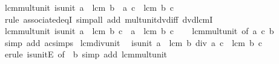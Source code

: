 \begin{isabellebody}
\endisatagproof
{\isafoldproof}%
%
\isadelimproof
\isanewline
%
\endisadelimproof
\isanewline
{}\isamarkupfalse%
\ lcm{\isacharunderscore}{\kern0pt}mult{\isacharunderscore}{\kern0pt}unit{}{\isacharcolon}{\kern0pt}\ {\isachardoublequoteopen}is{\isacharunderscore}{\kern0pt}unit\ a\ {\isasymLongrightarrow}\ lcm\ {\isacharparenleft}{\kern0pt}b\ {\isacharasterisk}{\kern0pt}\ a{\isacharparenright}{\kern0pt}\ c\ {\isacharequal}{\kern0pt}\ lcm\ b\ c{\isachardoublequoteclose}\isanewline
%
\isadelimproof
\ \ %
\endisadelimproof
%
\isatagproof
{}\isamarkupfalse%
\ {\isacharparenleft}{\kern0pt}rule\ associated{\isacharunderscore}{\kern0pt}eqI{\isacharparenright}{\kern0pt}\ {\isacharparenleft}{\kern0pt}simp{\isacharunderscore}{\kern0pt}all\ add{\isacharcolon}{\kern0pt}\ mult{\isacharunderscore}{\kern0pt}unit{\isacharunderscore}{\kern0pt}dvd{\isacharunderscore}{\kern0pt}iff\ dvd{\isacharunderscore}{\kern0pt}lcmI{}{\isacharparenright}{\kern0pt}%
\endisatagproof
{\isafoldproof}%
%
\isadelimproof
\isanewline
%
\endisadelimproof
\isanewline
{}\isamarkupfalse%
\ lcm{\isacharunderscore}{\kern0pt}mult{\isacharunderscore}{\kern0pt}unit{}{\isacharcolon}{\kern0pt}\ {\isachardoublequoteopen}is{\isacharunderscore}{\kern0pt}unit\ a\ {\isasymLongrightarrow}\ lcm\ b\ {\isacharparenleft}{\kern0pt}c\ {\isacharasterisk}{\kern0pt}\ a{\isacharparenright}{\kern0pt}\ {\isacharequal}{\kern0pt}\ lcm\ b\ c{\isachardoublequoteclose}\isanewline
%
\isadelimproof
\ \ %
\endisadelimproof
%
\isatagproof
{}\isamarkupfalse%
\ lcm{\isacharunderscore}{\kern0pt}mult{\isacharunderscore}{\kern0pt}unit{}\ {\isacharbrackleft}{\kern0pt}of\ a\ c\ b{\isacharbrackright}{\kern0pt}\ \isamarkupfalse%
\ {\isacharparenleft}{\kern0pt}simp\ add{\isacharcolon}{\kern0pt}\ ac{\isacharunderscore}{\kern0pt}simps{\isacharparenright}{\kern0pt}%
\endisatagproof
{\isafoldproof}%
%
\isadelimproof
\isanewline
%
\endisadelimproof
\isanewline
{}\isamarkupfalse%
\ lcm{\isacharunderscore}{\kern0pt}div{\isacharunderscore}{\kern0pt}unit{}{\isacharcolon}{\kern0pt}\isanewline
\ \ {\isachardoublequoteopen}is{\isacharunderscore}{\kern0pt}unit\ a\ {\isasymLongrightarrow}\ lcm\ {\isacharparenleft}{\kern0pt}b\ div\ a{\isacharparenright}{\kern0pt}\ c\ {\isacharequal}{\kern0pt}\ lcm\ b\ c{\isachardoublequoteclose}\isanewline
%
\isadelimproof
\ \ %
\endisadelimproof
%
\isatagproof
{}\isamarkupfalse%
\ {\isacharparenleft}{\kern0pt}erule\ is{\isacharunderscore}{\kern0pt}unitE\ {\isacharbrackleft}{\kern0pt}of\ {\isacharunderscore}{\kern0pt}\ b{\isacharbrackright}{\kern0pt}{\isacharparenright}{\kern0pt}\ {\isacharparenleft}{\kern0pt}simp\ add{\isacharcolon}{\kern0pt}\ lcm{\isacharunderscore}{\kern0pt}mult{\isacharunderscore}{\kern0pt}unit{}{\isacharparenright}{\kern0pt}%

\end{isabellebody}
